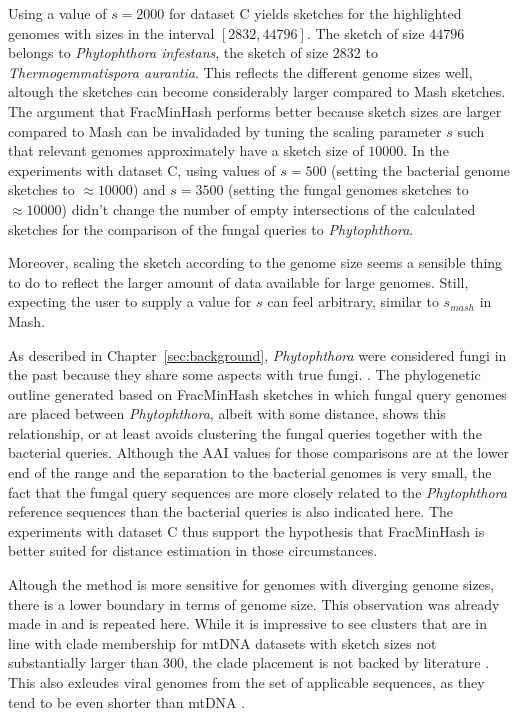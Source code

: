 Using a value of $s=2000$ for dataset C yields sketches for the highlighted
genomes with sizes in the interval $[2832, 44796]$. The sketch of size $44796$
belongs to \textit{Phytophthora infestans}, the sketch of size $2832$ to
\textit{Thermogemmatispora aurantia}. This reflects the different genome sizes
well, altough the sketches can become considerably larger compared to Mash
sketches. The argument that FracMinHash performs better because sketch sizes
are larger compared to Mash can be invalidaded by tuning the scaling parameter
$s$ such that relevant genomes approximately have a sketch size of $10000$. In
the experiments with dataset C, using values of $s=500$ (setting the bacterial
genome sketches to $\approx 10000$) and $s=3500$ (setting the fungal genomes
sketches to $\approx 10000$) didn't change the number of empty intersections of
the calculated sketches for the comparison of the fungal queries to
\textit{Phytophthora}. 

Moreover, scaling the sketch according to the genome size seems a sensible thing
to do to reflect the larger amount of data available for large genomes. Still,
expecting the user to supply a value for $s$ can feel arbitrary, similar to
$s_{mash}$ in Mash.

As described in Chapter~\ref{sec:background}, \textit{Phytophthora} were
considered fungi in the past because they share some aspects with true fungi.
\cite{debaryResearchesNaturePotatofungus1876,rossmanWhyArePhytophthora2012}. The
phylogenetic outline generated based on FracMinHash sketches in which fungal
query genomes are placed between \textit{Phytophthora}, albeit with some
distance, shows this relationship, or at least avoids clustering the fungal
queries together with the bacterial queries. Although the AAI values for those
comparisons are at the lower end of the range and the separation to the
bacterial genomes is very small, the fact that the fungal query sequences are
more closely related to the \textit{Phytophthora} reference sequences than the
bacterial queries is also indicated here. The experiments with dataset C thus
support the hypothesis that FracMinHash is better suited for distance estimation
in those circumstances.

Altough the method is more sensitive for genomes with diverging genome sizes,
there is a lower boundary in terms of genome size. This observation was already
made in
\cite{irberLightweightCompositionalAnalysis2022,heraDerivingConfidenceIntervals2023}
and is repeated here. While it is impressive to see clusters that are in line
with clade membership for mtDNA datasets with sketch sizes not substantially
larger than $300$, the clade placement is not backed by literature
\cite{winkworthComparativeAnalysesComplete2022,abadPhytophthoraTaxonomicPhylogenetic2023a,
yangExpandedPhylogenyGenus2017}. This also exlcudes viral genomes from the set
of applicable sequences, as they tend to be even shorter than mtDNA
\cite{dimmockIntroductionModernVirology2001}.

